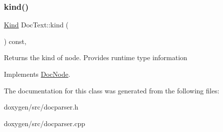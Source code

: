 \subsubsection{\texorpdfstring{kind()}{kind()}}
{\footnotesize\ttfamily \mbox{\hyperlink{class_doc_node_aebd16e89ca590d84cbd40543ea5faadb}{Kind}} Doc\+Text\+::kind (\begin{DoxyParamCaption}{ }\end{DoxyParamCaption}) const\hspace{0.3cm}{\ttfamily [inline]}, {\ttfamily [virtual]}}

Returns the kind of node. Provides runtime type information 

Implements \mbox{\hyperlink{class_doc_node_a108ffd214a72ba6e93dac084a8f58049}{Doc\+Node}}.



The documentation for this class was generated from the following files\+:\begin{DoxyCompactItemize}
\item 
doxygen/src/docparser.\+h\item 
doxygen/src/docparser.\+cpp\end{DoxyCompactItemize}
